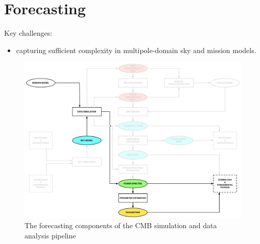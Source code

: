 
\section{Forecasting}

Key challenges: 
\begin{itemize}
\item capturing sufficient complexity in multipole-domain sky and mission models.
\end{itemize}

\begin{figure}[htbp]
\centering
\includegraphics[width=1\textwidth]{Analysis/fc}
\caption{The forecasting components of the CMB simulation and data analysis pipeline}
\label{default}

\end{figure}
